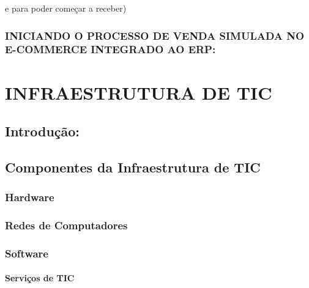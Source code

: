 \documentclass[
]{book}
\begin{document}
e para poder começar a receber)

\subsection{INICIANDO O PROCESSO DE VENDA SIMULADA NO E-COMMERCE INTEGRADO AO ERP:}\label{iniciando-o-processo-de-venda-simulada-no-e-commerce-integrado-ao-erp}

\chapter{INFRAESTRUTURA DE TIC}\label{infraestrutura-de-tic}

\section{Introdução:}\label{introduuxe7uxe3o-1}

\section{Componentes da Infraestrutura de TIC}\label{componentes-da-infraestrutura-de-tic}

\subsection{Hardware}\label{hardware}

\subsection{Redes de Computadores}\label{redes-de-computadores}

\subsection{Software}\label{software}

\subsubsection{Serviços de TIC}\label{serviuxe7os-de-tic}
\end{document}
